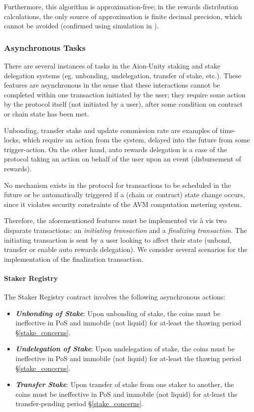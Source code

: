 Furthermore, this algorithm is approximation-free; in the rewards distribution calculations, the only source of approximation is finite decimal precision, which cannot be avoided (confirmed using simulation in \cite{Sha19}).  

\clearpage
\subsubsection{Asynchronous Tasks}
There are several instances of  tasks in the Aion-Unity staking and stake delegation systems (eg. unbonding, undelegation, transfer of stake, etc.). These features are asynchronous in the sense that these interactions cannot be completed within one transaction initiated by the user; they require some action by the protocol itself (not initiated by a user), after some condition on contract or chain state has been met.   

Unbonding, transfer stake and update commission rate are examples of time-locks, which require an action from the system, delayed into the future from some trigger-action. On the other hand, auto rewards delegation is a case of the protocol taking an action on behalf of the user upon an event (disbursement of rewards).

No mechanism exists in the protocol for transactions to be scheduled in the future or be automatically triggered if a (chain or contract) state change occurs, since it violates security constraints of the AVM computation metering system. 

Therefore, the aforementioned features must be implemented vis à vis two disparate transactions: an \textit{initiating transaction} and a \textit{finalizing transaction}. The initiating transaction is sent by a user looking to affect their state (unbond, transfer or enable auto rewards delegation). We consider several scenarios for the implementation of the finalization transaction. 

\paragraph{Staker Registry} The Staker Registry contract involves the following asynchronous actions: 
\begin{itemize}
    \item \textit{\textbf{Unbonding of Stake}}: Upon unbonding of stake, the coins must be ineffective in PoS and immobile (not liquid) for at-least the thawing period \S\ref{stake_concerns}.
    \item \textit{\textbf{Undelegation of Stake}}: Upon undelegation of stake, the coins must be ineffective in PoS and immobile (not liquid) for at-least the thawing period \S\ref{stake_concerns}.
    \item \textit{\textbf{Transfer Stake}}: Upon transfer of stake from one staker to another, the coins must be ineffective in PoS and immobile (not liquid) for at-least the transfer-pending period \S\ref{stake_concerns}. 
\end{itemize}

